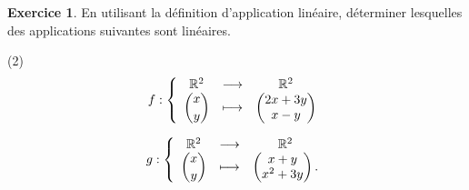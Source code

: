 \documentclass{article}
\theoremstyle{definition}
\newtheorem{exercice}{Exercice}
\begin{document}
\pagestyle{fancy}

\fancyhf{} %
\fancyhead[L]{\large \textbf{\Niveau}}
\fancyhead[C]{\large \textbf{\Chapitre}}

\large

\begin{exercice}
  En utilisant la définition d'application linéaire,  déterminer lesquelles des applications suivantes sont linéaires.
  \begin{tasks}(2)
    \task[] \begin{equation*}
      f : \left \{
        \begin{array}{ccc}
          \mathbb{R}^2 &\longrightarrow &\mathbb{R}^2\\
          \dbinom{x}{y} &\longmapsto &
          \begin{pmatrix}
            2x + 3y \\
            x - y
          \end{pmatrix}
        \end{array} \right.
      \end{equation*}
      

    \task[] \begin{equation*}
      g : \left \{
        \begin{array}{ccc}
          \mathbb{R}^2 &\longrightarrow &\mathbb{R}^2\\
          \dbinom{x}{y} &\longmapsto &
      \begin{pmatrix}
        x + y \\
        x^2 + 3y
      \end{pmatrix}.
        \end{array} \right.
      \end{equation*}

  \end{tasks}
\end{exercice}
\end{document}
